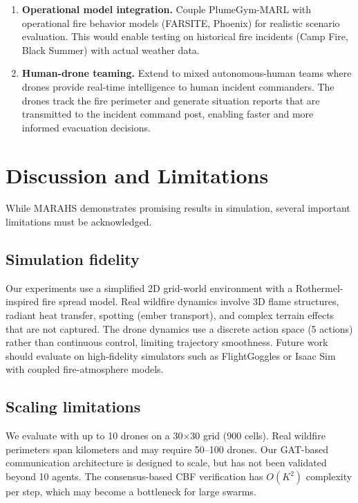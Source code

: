 \documentclass[12pt,a4paper]{article}
\begin{document}
\begin{enumerate}[leftmargin=*]
    \item \textbf{Operational model integration.} Couple PlumeGym-MARL with operational fire behavior models (FARSITE, Phoenix) for realistic scenario evaluation. This would enable testing on historical fire incidents (Camp Fire, Black Summer) with actual weather data.
    
    \item \textbf{Human-drone teaming.} Extend to mixed autonomous-human teams where drones provide real-time intelligence to human incident commanders. The drones track the fire perimeter and generate situation reports that are transmitted to the incident command post, enabling faster and more informed evacuation decisions.
\end{enumerate}


\section{Discussion and Limitations}
\label{sec:discussion}

While MARAHS demonstrates promising results in simulation, several important limitations must be acknowledged.

\subsection{Simulation fidelity}
Our experiments use a simplified 2D grid-world environment with a Rothermel-inspired fire spread model. Real wildfire dynamics involve 3D flame structures, radiant heat transfer, spotting (ember transport), and complex terrain effects that are not captured. The drone dynamics use a discrete action space (5 actions) rather than continuous control, limiting trajectory smoothness. Future work should evaluate on high-fidelity simulators such as FlightGoggles or Isaac Sim with coupled fire-atmosphere models.

\subsection{Scaling limitations}
We evaluate with up to 10 drones on a 30$\times$30 grid (900 cells). Real wildfire perimeters span kilometers and may require 50--100 drones. Our GAT-based communication architecture is designed to scale, but has not been validated beyond 10 agents. The consensus-based CBF verification has $O(K^2)$ complexity per step, which may become a bottleneck for large swarms.
\end{document}
